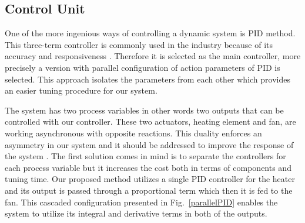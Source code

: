 \documentclass[conference]{IEEEtran}
\begin{document}
\subsection{Control Unit}
One of the more ingenious ways of controlling a dynamic system is PID method. This three-term controller is commonly used in the industry because of its accuracy and responsiveness \cite{b2}. Therefore it is selected as the main controller, more precisely a version with parallel configuration of action parameters of PID is selected. This approach isolates the parameters from each other which provides an easier tuning procedure for our system.









The system has two process variables in other words two outputs that can be controlled with our controller. These two actuators, heating element and fan, are working asynchronous with opposite reactions. This duality enforces an asymmetry in our system and it should be addressed to improve the response of the system \cite{b3}. The first solution comes in mind is to separate the controllers for each process variable but it increases the cost both in terms of components and tuning time. Our proposed method utilizes a single PID controller for the heater and its output is passed through a proportional term which then it is fed to the fan. This cascaded configuration presented in Fig.~\ref{parallelPID} enables the system to utilize its integral and derivative terms in both of the outputs. 
\end{document}
